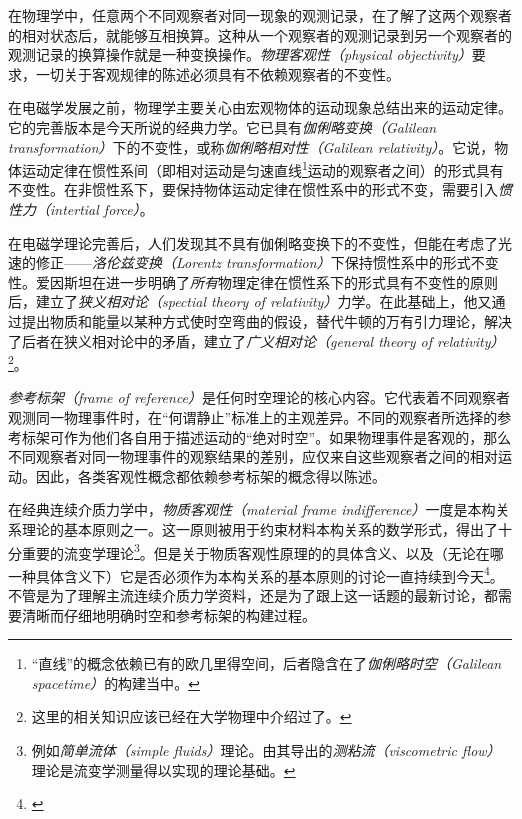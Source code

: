\documentclass[zihao=-4,linespread=1.5,a4paper,heading=true,twoside]{ctexbook}
\theoremstyle{definition}
\theoremstyle{plain}
\begin{document}
在物理学中，任意两个不同观察者对同一现象的观测记录，在了解了这两个观察者的相对状态后，就能够互相换算。这种从一个观察者的观测记录到另一个观察者的观测记录的换算操作就是一种变换操作。\emph{物理客观性（physical objectivity）}要求，一切关于客观规律的陈述必须具有不依赖观察者的不变性。

在电磁学发展之前，物理学主要关心由宏观物体的运动现象总结出来的运动定律。它的完善版本是今天所说的经典力学。它已具有\emph{伽俐略变换（Galilean transformation）}下的不变性，或称\emph{伽俐略相对性（Galilean relativity）}。它说，物体运动定律在惯性系间（即相对运动是匀速直线\footnote{“直线”的概念依赖已有的欧几里得空间，后者隐含在了\emph{伽俐略时空（Galilean spacetime）}的构建当中\cite{Weatherall2022}。}运动的观察者之间）的形式具有不变性。在非惯性系下，要保持物体运动定律在惯性系中的形式不变，需要引入\emph{惯性力（intertial force）}。

在电磁学理论完善后，人们发现其不具有伽俐略变换下的不变性，但能在考虑了光速的修正——\emph{洛伦兹变换（Lorentz transformation）}下保持惯性系中的形式不变性。爱因斯坦在进一步明确了\emph{所有}物理定律在惯性系下的形式具有不变性的原则后，建立了\emph{狭义相对论（spectial theory of relativity）}力学。在此基础上，他又通过提出物质和能量以某种方式使时空弯曲的假设，替代牛顿的万有引力理论，解决了后者在狭义相对论中的矛盾，建立了\emph{广义相对论（general theory of  relativity）}\footnote{这里的相关知识应该已经在大学物理中介绍过了\cite[\S 1,\S 2.5]{邓文基2009大物上}\cite[\S 24]{邓文基2009大物下}。}。

\emph{参考标架（frame of reference）}是任何时空理论的核心内容。它代表着不同观察者观测同一物理事件时，在“何谓静止”标准上的主观差异。不同的观察者所选择的参考标架可作为他们各自用于描述运动的“绝对时空”。如果物理事件是客观的，那么不同观察者对同一物理事件的观察结果的差别，应仅来自这些观察者之间的相对运动。因此，各类客观性概念都依赖参考标架的概念得以陈述。

在经典连续介质力学中，\emph{物质客观性（material frame indifference）}一度是本构关系理论的基本原则之一\cite[Sect.293]{Truesdell1960}\cite[Sect.19]{Truesdell2004}。这一原则被用于约束材料本构关系的数学形式，得出了十分重要的流变学理论\footnote{例如\emph{简单流体（simple fluids）}理论\cite{Noll1958}。由其导出的\emph{测粘流（viscometric flow）}理论是流变学测量得以实现的理论基础\cite{Coleman1966}\cite{Walters1975}。}。但是关于物质客观性原理的的具体含义、以及（无论在哪一种具体含义下）它是否必须作为本构关系的基本原则的讨论一直持续到今天\footnote{\cite{Gennes1983}\cite{Frewer2009}}。不管是为了理解主流连续介质力学资料，还是为了跟上这一话题的最新讨论，都需要清晰而仔细地明确时空和参考标架的构建过程。
\end{document}
